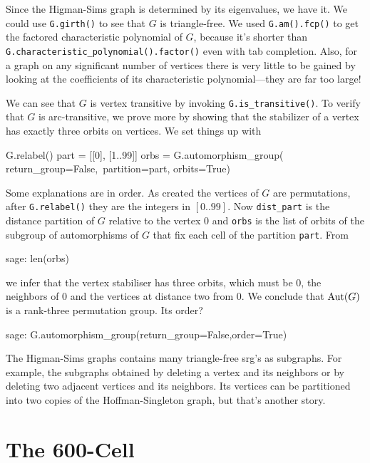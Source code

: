 Since the Higman-Sims graph is determined by its eigenvalues, we have it.
We could use \verb|G.girth()| to see that $G$ is triangle-free.
We used \verb|G.am().fcp()| to get the factored characteristic polynomial
of $G$, because it's shorter than \verb|G.characteristic_polynomial().factor()|
even with tab completion. Also, for a graph on any significant number of vertices
there is very little to be gained by looking at the coefficients of its
characteristic polynomial---they are far too large!

We can see that $G$ is vertex transitive by invoking \verb|G.is_transitive()|.
To verify that $G$ is arc-transitive, we prove more by showing
that the stabilizer of a vertex has exactly three orbits on vertices.
We set things up with
\begin{sageblock}
    G.relabel()
    part = [[0], [1..99]]
    orbs = G.automorphism_group( return_group=False,\
      partition=part, orbits=True)
\end{sageblock}
Some explanations are in order. As created the vertices of $G$ are permutations,
after \verb|G.relabel()| they are the integers in $[0..99]$. Now
\verb|dist_part| is the distance partition of $G$ relative to the vertex $0$
and \verb|orbs| is the list of orbits of the subgroup of automorphisms of $G$
that fix each cell of the partition \texttt{part}. From
\begin{sageexample}
    sage: len(orbs)
\end{sageexample}
we infer that the vertex stabiliser has three orbits, which must be 0,
the neighbors of 0 and the vertices at distance two from 0. We conclude
that $\mathrm{Aut}(G)$ is a rank-three permutation group. Its order?
\begin{sageexample}
    sage: G.automorphism_group(return_group=False,order=True)
\end{sageexample}

The Higman-Sims graphs contains many triangle-free srg's as subgraphs.
For example, the subgraphs obtained by deleting a vertex and its neighbors
or by deleting two adjacent vertices and its neighbors. Its vertices
can be partitioned into two copies of the Hoffman-Singleton graph,
but that's another story.

\section{The 600-Cell}

